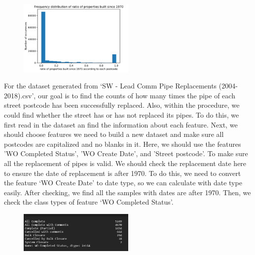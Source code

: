 \documentclass[11pt,twoside]{article}
\numberwithin{Theorem}{section}
\numberwithin{Definition}{section}
\numberwithin{Lemma}{section}
\numberwithin{Algorithm}{section}
\numberwithin{equation}{section}
\begin{document}
\begin{figure}[!ht]
    \centering
    \includegraphics[width=0.5\textwidth]{p9.png}
    \end{figure}

For the dataset generated from ‘SW - Lead Comm Pipe Replacements (2004-2018).csv’, our goal is to find the counts of how many times the pipe of each street postcode has been successfully replaced. Also, within the procedure, we could find whether the street has or has not replaced its pipes. To do this, we first read in the dataset an find the information about each feature. Next, we should choose features we need to build a new dataset and make sure all postcodes are capitalized and no blanks in it. Here, we should use the features 'WO Completed Status', 'WO Create Date', and 'Street postcode'. To make sure all the replacement of pipes is valid. We should check the replacement date here to ensure the date of replacement is after 1970. To do this, we need to convert the feature ‘WO Create Date’ to date type, so we can calculate with date type easily. After checking, we find all the samples with dates are after 1970. Then, we check the class types of feature ‘WO Completed Status’. 

\begin{figure}[!ht]
    \centering
    \includegraphics[width=0.5\textwidth]{p10.png}
    \end{figure}
\end{document}

